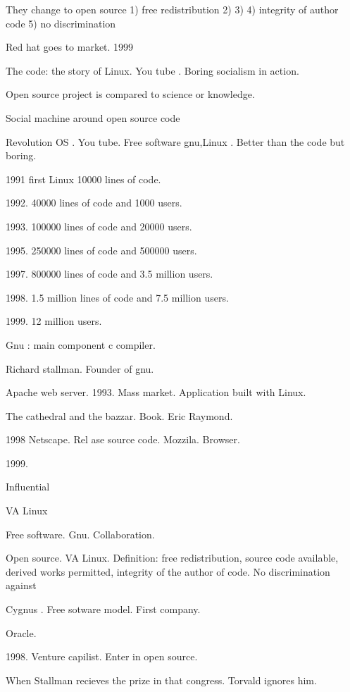   They change to open source 
  1) free redistribution 
  2) 
  3) 
  4) integrity of author code 
  5) no discrimination  
  
  
  Red hat goes to market. 1999
  
  The code: the story of Linux. You tube . Boring  socialism in action. 
  
  Open source project is compared to science or knowledge. 
  
  
  Social machine around open source code 
  
  Revolution OS . You tube. Free software gnu,Linux . Better than the code but boring. 
  
  1991 first Linux 10000 lines of code. 
  
  1992. 40000 lines of code and 1000 users. 
  
  1993. 100000 lines of code and 20000 users. 
  
  1995. 250000 lines of code and 500000 users.
  
  1997. 800000 lines of code and 3.5 million users.  
  
  1998. 1.5 million lines of code and 7.5 million users. 
  
  1999. 12 million users. 
  
  
  
  Gnu : main component c compiler. 
  
  Richard stallman. Founder of gnu. 
  
  Apache web server. 1993. Mass market. 
  Application built with Linux. 
  
  
  The cathedral and the bazzar. Book. Eric Raymond. 
  
  
  
  1998 Netscape. Rel ase source code. Mozzila. Browser. 
  
  1999. 
  
  Influential 
  
  
  VA Linux 
  
  Free software. Gnu. Collaboration. 
  
  Open source. VA Linux. 
  Definition: free redistribution, source code available, derived works permitted, integrity of the author of code. No discrimination against 
  
  Cygnus . Free sotware model.  First company. 
  
  Oracle. 
  
  1998. Venture capilist. Enter in open source. 
  
  When Stallman recieves the prize in that congress. Torvald ignores him. 
  
